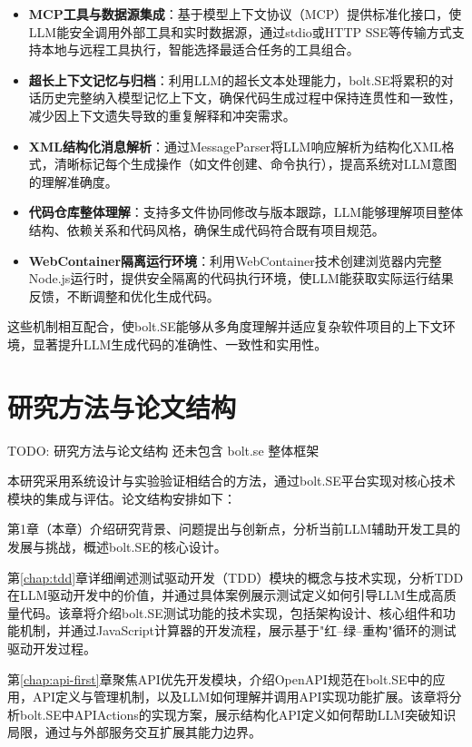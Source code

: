 \begin{itemize}
    \item \textbf{MCP工具与数据源集成}：基于模型上下文协议（MCP）提供标准化接口，使LLM能安全调用外部工具和实时数据源，通过stdio或HTTP SSE等传输方式支持本地与远程工具执行，智能选择最适合任务的工具组合。
    
    \item \textbf{超长上下文记忆与归档}：利用LLM的超长文本处理能力，bolt.SE将累积的对话历史完整纳入模型记忆上下文，确保代码生成过程中保持连贯性和一致性，减少因上下文遗失导致的重复解释和冲突需求。
    
    \item \textbf{XML结构化消息解析}：通过MessageParser将LLM响应解析为结构化XML格式，清晰标记每个生成操作（如文件创建、命令执行），提高系统对LLM意图的理解准确度。
    
    \item \textbf{代码仓库整体理解}：支持多文件协同修改与版本跟踪，LLM能够理解项目整体结构、依赖关系和代码风格，确保生成代码符合既有项目规范。
    
    \item \textbf{WebContainer隔离运行环境}：利用WebContainer技术创建浏览器内完整Node.js运行时，提供安全隔离的代码执行环境，使LLM能获取实际运行结果反馈，不断调整和优化生成代码。
\end{itemize}

这些机制相互配合，使bolt.SE能够从多角度理解并适应复杂软件项目的上下文环境，显著提升LLM生成代码的准确性、一致性和实用性。

\section{研究方法与论文结构}
TODO: 研究方法与论文结构 还未包含 bolt.se 整体框架

本研究采用系统设计与实验验证相结合的方法，通过bolt.SE平台实现对核心技术模块的集成与评估。论文结构安排如下：

第1章（本章）介绍研究背景、问题提出与创新点，分析当前LLM辅助开发工具的发展与挑战，概述bolt.SE的核心设计。

第\ref{chap:tdd}章详细阐述测试驱动开发（TDD）模块的概念与技术实现，分析TDD在LLM驱动开发中的价值，并通过具体案例展示测试定义如何引导LLM生成高质量代码。该章将介绍bolt.SE测试功能的技术实现，包括架构设计、核心组件和功能机制，并通过JavaScript计算器的开发流程，展示基于"红–绿–重构"循环的测试驱动开发过程。

第\ref{chap:api-first}章聚焦API优先开发模块，介绍OpenAPI规范在bolt.SE中的应用，API定义与管理机制，以及LLM如何理解并调用API实现功能扩展。该章将分析bolt.SE中APIActions的实现方案，展示结构化API定义如何帮助LLM突破知识局限，通过与外部服务交互扩展其能力边界。

